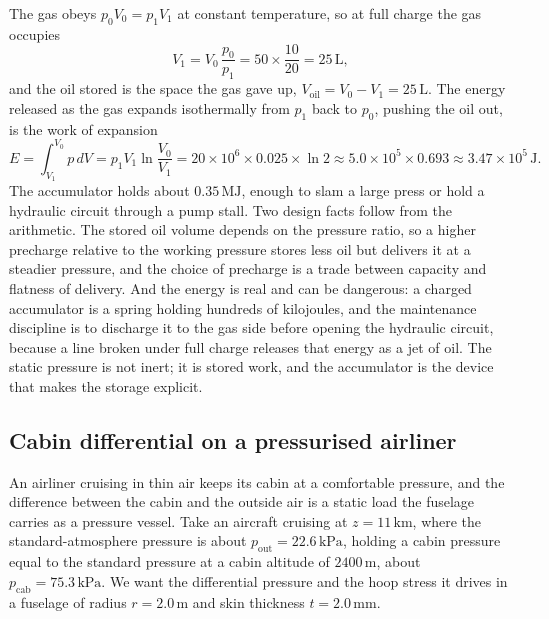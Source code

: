 The gas obeys $p_0 V_0 = p_1 V_1$ at constant temperature, so at full charge
the gas occupies
\[
V_1 = V_0\,\frac{p_0}{p_1}
= 50 \times \frac{10}{20}
= 25\,\si{\liter},
\]
and the oil stored is the space the gas gave up, $V_{\text{oil}} = V_0 -
V_1 = 25\,\si{\liter}$. The energy released as the gas expands isothermally
from $p_1$ back to $p_0$, pushing the oil out, is the work of expansion
\[
E = \int_{V_1}^{V_0} p\,dV
= p_1 V_1 \ln\!\frac{V_0}{V_1}
= 20 \times 10^6 \times 0.025 \times \ln 2
\approx 5.0 \times 10^5 \times 0.693
\approx 3.47 \times 10^5\,\text{J}.
\]
The accumulator holds about $0.35\,\text{MJ}$, enough to slam a large press
or hold a hydraulic circuit through a pump stall. Two design facts follow
from the arithmetic. The stored oil volume depends on the pressure ratio,
so a higher precharge relative to the working pressure stores less oil but
delivers it at a steadier pressure, and the choice of precharge is a
trade between capacity and flatness of delivery. And the energy is real and
can be dangerous: a charged accumulator is a spring holding hundreds of
kilojoules, and the maintenance discipline is to discharge it to the gas
side before opening the hydraulic circuit, because a line broken under full
charge releases that energy as a jet of oil. The static pressure is not
inert; it is stored work, and the accumulator is the device that makes the
storage explicit.

\subsection{Cabin differential on a pressurised airliner}

An airliner cruising in thin air keeps its cabin at a comfortable pressure,
and the difference between the cabin and the outside air is a static load
the fuselage carries as a pressure vessel. Take an aircraft cruising at
$z = 11\,\si{\kilo\meter}$, where the standard-atmosphere pressure is about
$p_{\text{out}} = 22.6\,\text{kPa}$, holding a cabin pressure equal to the
standard pressure at a cabin altitude of $2400\,\si{\meter}$, about
$p_{\text{cab}} = 75.3\,\text{kPa}$. We want the differential pressure and
the hoop stress it drives in a fuselage of radius $r = 2.0\,\si{\meter}$ and
skin thickness $t = 2.0\,\si{\milli\meter}$.

